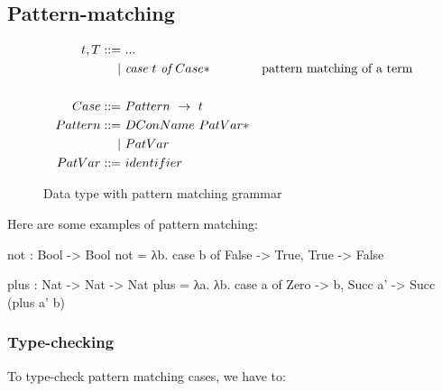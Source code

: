 \subsection{Pattern-matching}

\begin{figure}[H]
       \[
              \begin{aligned}
                     t, T ::= & \ ... \\
                     |        & \ \emph{case}\ t\ \emph{of}\ Case* & \text{pattern matching of a term} \\
                     \\
                     Case      ::= & \ Pattern\ \rightarrow\ t \\
                     Pattern   ::= & \ DConName\ PatVar* \\
                     |             & \ PatVar   \\
                     PatVar    ::= & \ identifier
              \end{aligned}
       \]
       \caption{Data type with pattern matching grammar}
\end{figure}

Here are some examples of pattern matching:

\begin{piforall}
not : Bool -> Bool
not = λb. case b of {
  False -> True,
  True -> False
}

plus : Nat -> Nat -> Nat
plus = λa. λb. case a of {
  Zero -> b,
  Succ a' -> Succ (plus a' b)
}
\end{piforall}

\subsubsection{Type-checking}

To type-check pattern matching cases, we have to:

